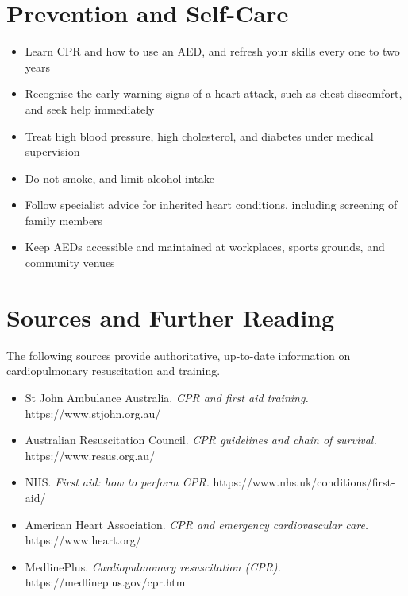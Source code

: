 \section*{Prevention and Self-Care}
\begin{itemize}
    \item Learn CPR and how to use an AED, and refresh your skills every one to two years
    \item Recognise the early warning signs of a heart attack, such as chest discomfort, and seek help immediately
    \item Treat high blood pressure, high cholesterol, and diabetes under medical supervision
    \item Do not smoke, and limit alcohol intake
    \item Follow specialist advice for inherited heart conditions, including screening of family members
    \item Keep AEDs accessible and maintained at workplaces, sports grounds, and community venues
\end{itemize}

\section*{Sources and Further Reading}
The following sources provide authoritative, up-to-date information on cardiopulmonary resuscitation and training.
\begin{itemize}
    \item St John Ambulance Australia. \textit{CPR and first aid training.} https://www.stjohn.org.au/
    \item Australian Resuscitation Council. \textit{CPR guidelines and chain of survival.} https://www.resus.org.au/
    \item NHS. \textit{First aid: how to perform CPR.} https://www.nhs.uk/conditions/first-aid/
    \item American Heart Association. \textit{CPR and emergency cardiovascular care.} https://www.heart.org/
    \item MedlinePlus. \textit{Cardiopulmonary resuscitation (CPR).} https://medlineplus.gov/cpr.html
\end{itemize}
